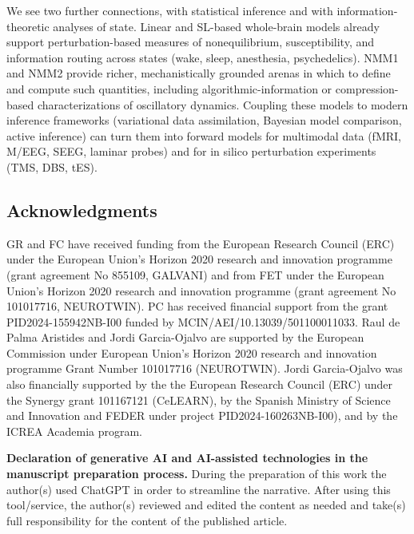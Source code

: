 \documentclass[12pt]{article}
\numberwithin{equation}{section}
\newcommand{\rev}[1]{\begingroup\color{navyblue}#1\endgroup}
\begin{document}
\rev{We see two further connections, with statistical inference and with information-theoretic analyses of state.} Linear and SL-based whole-brain models already support perturbation-based measures of nonequilibrium, susceptibility, and information routing across states (wake, sleep, anesthesia, psychedelics).\cite{decoTurbulentlikeDynamicsHuman2020,Escrichs2022Turbulence,cruzatEffectsClassicPsychedelic2022} NMM1 and NMM2 provide richer, mechanistically grounded arenas in which to define and compute such quantities, including algorithmic-information or compression-based characterizations of oscillatory dynamics. Coupling these models to modern inference frameworks (variational data assimilation, Bayesian model comparison, active inference) can turn them into forward models for multimodal data (fMRI, M/EEG, SEEG, laminar probes) and for in silico perturbation experiments (TMS, DBS, tES).\cite{breakspearDynamicModelsLargescale2017,Sadeghi2020,duchetHowDesignOptimal2024,ruffiniAlgorithmicAgentPerspective2024} 




 \subsection*{Acknowledgments}
GR and FC have received funding from the European Research Council (ERC) under the European Union’s Horizon 2020 research and innovation programme (grant agreement No 855109, GALVANI) and from FET under the European Union’s Horizon 2020 research and innovation programme (grant agreement No 101017716, NEUROTWIN). 
PC has received financial support from the grant PID2024-155942NB-I00 funded by MCIN/AEI/10.13039/501100011033.
Raul de Palma Aristides and Jordi Garcia-Ojalvo are supported by the European Commission under European Union’s Horizon 2020 research and innovation programme Grant Number 101017716 (NEUROTWIN). Jordi Garcia-Ojalvo was also financially supported by the the European Research Council (ERC) under the Synergy grant 101167121 (CeLEARN), by the Spanish Ministry of Science and Innovation and FEDER under project PID2024-160263NB-I00), and by the ICREA Academia program.

\textbf{Declaration of generative AI and AI-assisted technologies in the manuscript preparation process.}
During the preparation of this work the author(s) used ChatGPT in order to streamline the narrative. After using this tool/service, the author(s) reviewed and edited the content as needed and take(s) full responsibility for the content of the published article.



\clearpage


\end{document}
